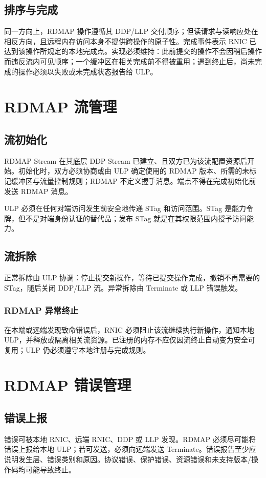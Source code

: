 \documentclass[11pt,a4paper]{article}
\begin{document}
\subsection{排序与完成}
同一方向上，RDMAP 操作遵循其 DDP/LLP 交付顺序；但读请求与读响应处在相反方向，且远程内存访问本身不提供跨操作的原子性。完成事件表示 RNIC 已达到该操作所规定的本地完成点。实现必须维持：此前提交的操作不会因稍后操作而违反流内可见顺序；一个缓冲区在相关完成前不得被重用；遇到终止后，尚未完成的操作必须以失败或未完成状态报告给 ULP。
\section{RDMAP 流管理}
\subsection{流初始化}
RDMAP Stream 在其底层 DDP Stream 已建立、且双方已为该流配置资源后开始。初始化时，双方必须协商或由 ULP 确定使用的 RDMAP 版本、所需的未标记缓冲区与流量控制规则；RDMAP 不定义握手消息。端点不得在完成初始化前发送 RDMAP 消息。

ULP 必须在任何对端访问发生前安全地传递 STag 和访问范围。STag 是能力令牌，但不是对端身份认证的替代品；发布 STag 就是在其权限范围内授予访问能力。
\subsection{流拆除}
正常拆除由 ULP 协调：停止提交新操作，等待已提交操作完成，撤销不再需要的 STag，随后关闭 DDP/LLP 流。异常拆除由 Terminate 或 LLP 错误触发。\subsubsection{RDMAP 异常终止}
在本端或远端发现致命错误后，RNIC 必须阻止该流继续执行新操作，通知本地 ULP，并释放或隔离相关流资源。已注册的内存不应仅因流终止自动变为安全可复用；ULP 仍必须遵守本地注册与完成规则。
\section{RDMAP 错误管理}
\subsection{错误上报}
错误可被本地 RNIC、远端 RNIC、DDP 或 LLP 发现。RDMAP 必须尽可能将错误上报给本地 ULP；若可发送，必须向远端发送 Terminate。错误报告至少应说明发生层、错误类别和原因。协议错误、保护错误、资源错误和未支持版本/操作码均可能导致终止。
\end{document}
